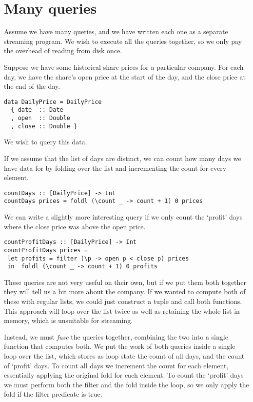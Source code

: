 \section{Many queries}

Assume we have many queries, and we have written each one as a separate streaming program.
We wish to execute all the queries together, so we only pay the overhead of reading from disk once.

Suppose we have some historical share prices for a particular company.
For each day, we have the share's open price at the start of the day, and the close price at the end of the day.

\begin{lstlisting}
data DailyPrice = DailyPrice
  { date  :: Date
  , open  :: Double
  , close :: Double }
\end{lstlisting}

We wish to query this data.

If we assume that the list of days are distinct, we can count how many days we have data for by folding over the list and incrementing the count for every element.

\begin{lstlisting}
countDays :: [DailyPrice] -> Int
countDays prices = foldl (\count _ -> count + 1) 0 prices
\end{lstlisting}

We can write a slightly more interesting query if we only count the `profit' days where the close price was above the open price.

\begin{lstlisting}
countProfitDays :: [DailyPrice] -> Int
countProfitDays prices =
 let profits = filter (\p -> open p < close p) prices
 in  foldl (\count _ -> count + 1) 0 profits
\end{lstlisting}

These queries are not very useful on their own, but if we put them both together they will tell us a bit more about the company.
If we wanted to compute both of these with regular lists, we could just construct a tuple and call both functions.
This approach will loop over the list twice as well as retaining the whole list in memory, which is unsuitable for streaming.

Instead, we must \emph{fuse} the queries together, combining the two into a single function that computes both.
We put the work of both queries inside a single loop over the list, which stores as loop state the count of all days, and the count of `profit' days.
To count all days we increment the count for each element, essentially applying the original fold for each element.
To count the `profit' days we must perform both the filter and the fold inside the loop, so we only apply the fold if the filter predicate is true.

